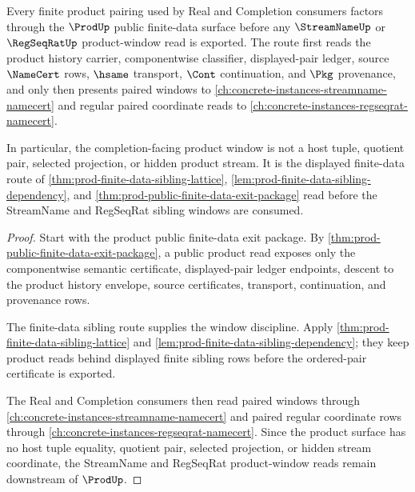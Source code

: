 \begin{theorem}
\label{thm:prod-finite-data-real-completion-sibling-route}
Every finite product pairing used by Real and Completion consumers factors through the $\ProdUp$ public finite-data surface before any $\StreamNameUp$ or $\RegSeqRatUp$ product-window read is exported. The route first reads the product history carrier, componentwise classifier, displayed-pair ledger, source $\NameCert$ rows, $\hsame$ transport, $\Cont$ continuation, and $\Pkg$ provenance, and only then presents paired windows to \autoref{ch:concrete-instances-streamname-namecert} and regular paired coordinate reads to \autoref{ch:concrete-instances-regseqrat-namecert}.

In particular, the completion-facing product window is not a host tuple, quotient pair, selected projection, or hidden product stream. It is the displayed finite-data route of \autoref{thm:prod-finite-data-sibling-lattice}, \autoref{lem:prod-finite-data-sibling-dependency}, and \autoref{thm:prod-public-finite-data-exit-package} read before the StreamName and RegSeqRat sibling windows are consumed.
\end{theorem}
\begin{proof}
Start with the product public finite-data exit package. By \autoref{thm:prod-public-finite-data-exit-package}, a public product read exposes only the componentwise semantic certificate, displayed-pair ledger endpoints, descent to the product history envelope, source certificates, transport, continuation, and provenance rows.

The finite-data sibling route supplies the window discipline. Apply \autoref{thm:prod-finite-data-sibling-lattice} and \autoref{lem:prod-finite-data-sibling-dependency}; they keep product reads behind displayed finite sibling rows before the ordered-pair certificate is exported.

The Real and Completion consumers then read paired windows through \autoref{ch:concrete-instances-streamname-namecert} and paired regular coordinate rows through \autoref{ch:concrete-instances-regseqrat-namecert}. Since the product surface has no host tuple equality, quotient pair, selected projection, or hidden stream coordinate, the StreamName and RegSeqRat product-window reads remain downstream of $\ProdUp$.
\end{proof}

